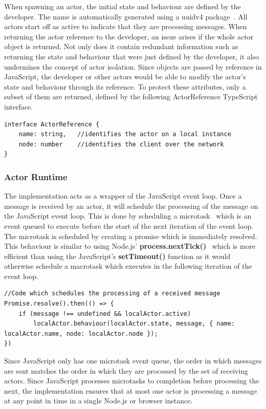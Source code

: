 \documentclass[lettersize,journal]{IEEEtran}
\begin{document}
When spawning an actor, the initial state and behaviour are defined by the developer. The name is automatically generated using a uuidv4 package~\cite{uuidv4}. All actors start off as active to indicate that they are processing messages. When returning the actor reference to the developer, an issue arises if the whole actor object is returned. Not only does it contain redundant information such as returning the state and behaviour that were just defined by the developer, it also undermines the concept of actor isolation. Since objects are passed by reference in JavaScript, the developer or other actors would be able to modify the actor's state and behaviour through its reference. To protect these attributes, only a subset of them are returned, defined by the following ActorReference TypeScript interface.
\begin{lstlisting}
interface ActorReference {
    name: string,   //identifies the actor on a local instance
    node: number    //identifies the client over the network
}
\end{lstlisting}
\subsubsection{Actor Runtime}
The implementation acts as a wrapper of the JavaScript event loop. Once a message is received by an actor, it will schedule the processing of the message on the JavaScript event loop. This is done by scheduling a microtask~\cite{microtasks} which is an event queued to execute before the start of the next iteration of the event loop. The microtask is scheduled by creating a promise which is immediately resolved. This behaviour is similar to using Node.js' \textbf{process.nextTick()}~\cite{nexttick} which is more efficient than using the JavaScript's \textbf{setTimeout()} function as it would otherwise schedule a macrotask which executes in the following iteration of the event loop.
\begin{lstlisting}
//Code which schedules the processing of a received message
Promise.resolve().then(() => {
    if (message !== undefined && localActor.active)
        localActor.behaviour(localActor.state, message, { name: localActor.name, node: localActor.node });
})
\end{lstlisting}
Since JavaScript only has one microtask event queue, the order in which messages are sent matches the order in which they are processed by the set of receiving actors. Since JavaScript processes microtasks to completion before processing the next, the implementation ensures that at most one actor is processing a message at any point in time in a single Node.js or browser instance.
\end{document}
